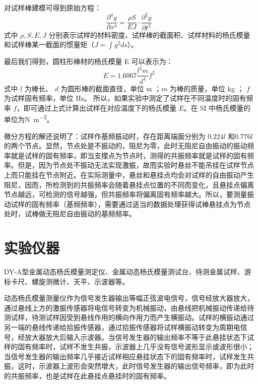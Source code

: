     对试样棒建模可得到原始方程：
    \begin{equation}
        \frac{\partial^4y}{\partial x^4}=\frac{\rho S}{EJ}\cdot\frac{\partial^2y}{\partial t^2}
    \end{equation}
    式中 $\rho,S,E,J$ 分别表示试样的材料密度、试样棒的截面积、试样材料的杨氏模量和试样棒某一截面的惯量矩（$J=\int y^2ds$）。\par
    最后我们得到，圆柱形棒材的杨氏模量 E 可以表示为：
    \begin{equation}
        E=1.6067\frac{l^3m}{d^4}f^2\label{eq:A5.2}
    \end{equation}
    式中 $l$ 为棒长、 $d$ 为圆形棒的截面直径，单位 \unit{\m} ；$m$ 为棒的质量，单位 \unit{\kg} ； $f$为试样固有频率，单位 \unit{\Hz}。 所以，如果实验中测定了试样在不同温度时的固有频率 $f$，即可通过上式计算出试样在对应温度下的杨氏模量 $E$。在 SI 中杨氏模量的单位为\unit{\N\per\m^2}。\par
    微分方程的解还说明了：试样作基频振动时，存在距离端面分别为 $0.224l$ 和$0.776l$的两个节点。显然，节点处是不振动的，阻尼为零，此时无阻尼自由振动的振动频率就是试样的固有频率，即当支撑点为节点时，测得的共振频率就是试样的固有频率。但是，因为节点处不振动无法实现激振，故而实验时悬丝不能吊挂在试样节点上而只能挂在节点附近。在实际测量中，悬丝和悬挂点均会对试样的自由振动产生阻尼，因而，所检测到的共振频率会随着悬挂点位置的不同而变化，且悬挂点偏离节点越远，可检测的信号越强，但共振频率将偏离固有频率越大。所以，要测量振动试样的固有频率（基频频率），需要通过适当的数据处理获得试棒悬挂点为节点处时，试棒做无阻尼自由振动的基频频率。 
\section{实验仪器}%
    DY-A型金属动态杨氏模量测定仪、金属动态杨氏模量测试台、待测金属试样、游标卡尺、螺旋测微计、天平、示波器等。 \par
    动态杨氏模量测量仪作为信号发生器输出等幅正弦波电信号，信号经放大器放大，通过悬线上方的激振传感器将电信号转变为机械振动，由悬线把机械振动传递给待测试样，待测试样因受到悬线作用的横向作用力而产生横振动。试样的横振动通过另一端的悬线传递给拾振传感器，通过拾振传感器将试样横振动转变为周期电信号，经放大器放大后输入示波器。当信号发生器的输出频率不等于此悬挂状态下试样的固有频率时，试样不发生共振，示波器上几乎没有信号波形显示或波形很小；当信号发生器的输出频率几乎接近试样相应悬挂状态下的固有频率时，试样发生共振，这时，示波器上波形会突然增大，此时信号发生器的输出信号频率，即为此时的共振频率，也是试样在此悬挂点悬挂时的固有频率。
